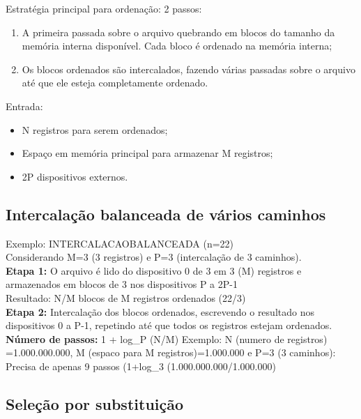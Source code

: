 \documentclass{article}
\begin{document}
Estratégia principal para ordenação: 2 passos:

\begin{enumerate}
   \item A primeira passada sobre o arquivo quebrando em blocos do tamanho da
memória interna disponível. Cada bloco é ordenado na memória interna;
   \item Os blocos ordenados são intercalados, fazendo várias passadas sobre o arquivo até que ele esteja completamente ordenado.
\end{enumerate}

Entrada:

\begin{itemize}
   \item N registros para serem ordenados;
   \item Espaço em memória principal para armazenar M registros;
   \item 2P dispositivos externos.
\end{itemize}

\subsection{Intercalação balanceada de vários caminhos}
Exemplo: INTERCALACAOBALANCEADA  (n=22)\\

Considerando M=3 (3 registros) e P=3 (intercalação de 3 caminhos).\\

\textbf{Etapa 1:} O arquivo é lido do dispositivo 0 de 3 em 3 (M) registros e armazenados em blocos de 3 nos
dispositivos P a 2P-1\\
Resultado: N/M blocos de M registros ordenados (22/3)\\

\textbf{Etapa 2:} Intercalação dos blocos ordenados, escrevendo o resultado nos dispositivos 0 a
P-1, repetindo até que todos os registros estejam ordenados.\\

\textbf{Número de passos:} 1 + log\_{P} (N/M)
Exemplo: N (numero de registros) =1.000.000.000, M (espaco para M registros)=1.000.000 e P=3 (3
caminhos): Precisa de apenas 9 passos (1+log\_3 (1.000.000.000/1.000.000)

\subsection{Seleção por substituição}
\end{document}
